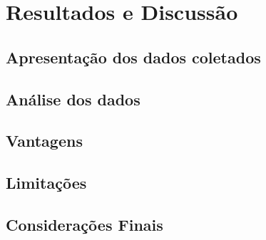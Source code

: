 \chapter{Resultados e Discussão}\label{cap:resultados}

\lipsum[75]

\section{Apresentação dos dados coletados}

\lipsum[76-77]

\section{Análise dos dados}

\lipsum[78-80]

\section{Vantagens}

\lipsum[60-62]

\section{Limitações}

\lipsum[63-64]

\section{Considerações Finais}

\lipsum[31]